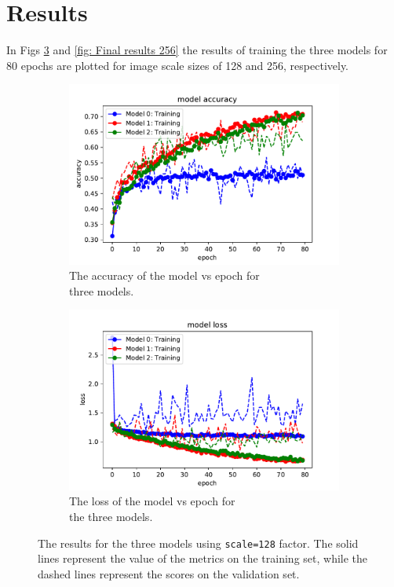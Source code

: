\documentclass[10pt,a4paper]{article}
\begin{document}
\newpage
\section{Results}
In Figs \ref{fig: Final results 128} and \ref{fig: Final results 256} the results of training the three models for 80 epochs are plotted for image scale sizes of 128 and 256, respectively. 

\begin{figure}[h]
\centering
\begin{subfigure}{.7\textwidth}
  \centering
  \includegraphics[scale=0.5]{accuracy_vs_epoch_128.pdf}
  \caption{The accuracy of the model vs epoch for\\ three models.}
  \label{fig:sub1 128}
\end{subfigure}%
\begin{subfigure}{.6\textwidth}
  \centering
  \includegraphics[scale=0.5]{loss_vs_epoch_128.pdf}
  \caption{The loss of the model vs epoch for\\ the three models.}
  \label{fig:sub2 128}
\end{subfigure}
\caption{The results for the three models using \lstinline{scale=128} factor. The solid lines represent the value of the metrics on the training set, while the dashed lines represent the scores on the validation set.}
\label{fig: Final results 128}
\end{figure}
\end{document}
